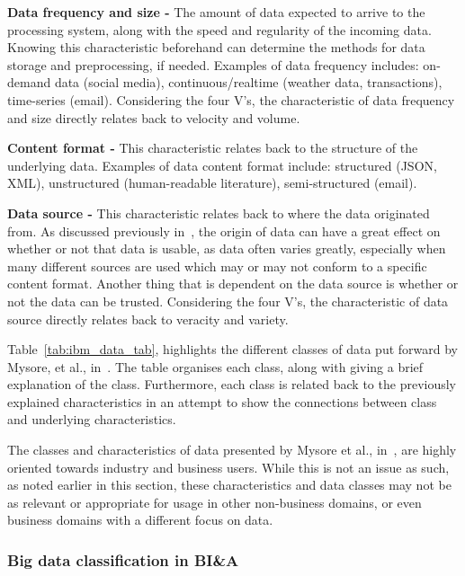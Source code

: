 \documentclass[a4paper,11pt]{article}
\begin{document}
\noindent \textbf{Data frequency and size -} The amount of data expected to arrive to the processing system, along with the speed
and regularity of the incoming data. Knowing this characteristic beforehand can determine the methods for data storage
and preprocessing, if needed. Examples of data frequency includes: on-demand data (social media), continuous/realtime
(weather data, transactions), time-series (email). Considering the four V's, the characteristic of data frequency and
size directly relates back to velocity and volume.

\noindent \textbf{Content format -} This characteristic relates back to the structure of the underlying data. Examples of data
content format include: structured (JSON, XML), unstructured (human-readable literature), semi-structured (email).

\noindent \textbf{Data source -} This characteristic relates back to where the data originated from. As discussed previously
in~, the origin of data can have a great effect on whether or not that data is usable, as data often
varies greatly, especially when many different sources are used which may or may  not conform to a specific content
format. Another thing that is dependent on the data source is whether or not the data can be trusted. Considering the
four V's, the characteristic of data source directly relates back to veracity and variety.

Table~\ref{tab:ibm_data_tab}, highlights the different classes of data put forward by Mysore, et al.,
in~\cite{ibm_big_2013}. The table organises each class, along with giving a brief explanation of the class. Furthermore,
each class is related back to the previously explained characteristics in an attempt to show the connections between
class and underlying characteristics.

The classes and characteristics of data presented by Mysore et al., in~\cite{ibm_big_2013}, are highly oriented towards
industry and business users. While this is not an issue as such, as noted earlier in this section, these characteristics
and data classes may not be as relevant or appropriate for usage in other non-business domains, or even business domains
with a different focus on data.





\subsubsection{Big data classification in BI\&A} %
\label{ssub:big_data_BIA}
\end{document}
